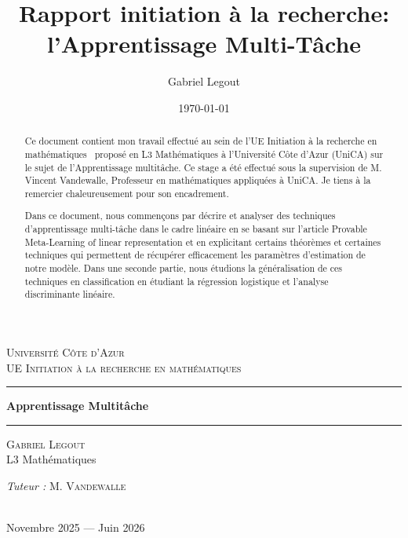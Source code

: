 \documentclass[12pt]{article}
\title{Rapport initiation à la recherche: l'Apprentissage Multi-Tâche}
\author{Gabriel Legout}
\date{\today}
\begin{document}
\begin{center}
\thispagestyle{empty}

\textsc{\LARGE Université Côte d'Azur}\\[2cm]

\textsc{\Large UE Initiation à la recherche en mathématiques}\\[1.5cm]

\vfill
\par\noindent\rule[20pt]{\textwidth}{1pt}
{ \huge \bfseries Apprentissage Multitâche }\\[18pt]

\par\noindent\rule[20pt]{\textwidth}{1pt}
\vfill
\begin{minipage}{0.4\textwidth}
    \begin{flushleft} \large
    \textsc{Gabriel Legout}\\
    L3 Mathématiques\\
    \end{flushleft}
\end{minipage}
\begin{minipage}{0.4\textwidth}
    \begin{flushright} \large
    \emph{Tuteur :} M. \textsc{Vandewalle}\\
    \end{flushright}
\end{minipage}\\[20pt]


{\large Novembre 2025 — Juin 2026}

\end{center}

\newpage
\thispagestyle{empty}
\null\vfill
\begin{abstract}
Ce document contient mon travail effectué au sein de l'UE \og Initiation à la recherche en mathématiques \fg \, proposé en L3 Mathématiques à l'Université Côte d'Azur (UniCA) sur le sujet de l'Apprentissage multitâche. Ce stage a été effectué sous la supervision de M. Vincent Vandewalle, Professeur en mathématiques appliquées à UniCA. Je tiens à la remercier chaleureusement pour son encadrement.

Dans ce document, nous commençons par décrire et analyser des techniques d'apprentissage multi-tâche dans le cadre linéaire en se basant sur l'article \og Provable Meta-Learning of linear representation \fg{} \cite{MTLR_1} et en explicitant certains théorèmes et certaines techniques qui permettent de récupérer efficacement les paramètres d'estimation de notre modèle. Dans une seconde partie, nous étudions la généralisation de ces techniques en classification en étudiant la régression logistique et l'analyse discriminante linéaire.
\end{abstract}
\vfill
\end{document}
